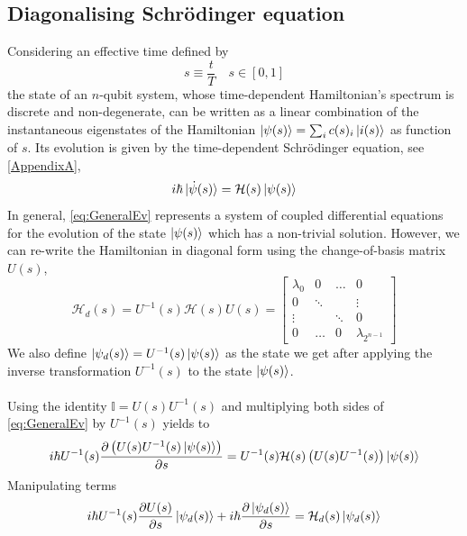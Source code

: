 \subsection{Diagonalising Schrödinger equation}
Considering an effective time defined by
\begin{equation}
    s \equiv \frac{t}{T} \quad s \in [0,1]
\end{equation}
the state of an $n$-qubit system, whose time-dependent Hamiltonian's spectrum is discrete and non-degenerate, can be written as a linear combination of the instantaneous eigenstates of the Hamiltonian $\ket{\psi(s)} = \sum_{i}c(s)_{i}\ket{i(s)}$ as function of $s$. Its evolution is given by the time-dependent Schrödinger equation, see \ref{AppendixA},
\begin{equation}
\label{eq:GeneralEv}
    i\hbar \ket{\dot{\psi}(s)} = \mathcal{H}(s) \ket{\psi(s)}
\end{equation}
In general, \ref{eq:GeneralEv} represents a system of coupled differential equations for the evolution of the state $\ket{\psi(s)}$ which has a non-trivial solution. However, we can re-write the Hamiltonian in diagonal form using the change-of-basis matrix $U(s)$,
\begin{equation}
    \mathcal{H}_{d}(s) = U^{-1}(s)\mathcal{H}(s)U(s) = \begin{bmatrix}
           \lambda_{0} & 0 & \hdots & 0 \\
           0 &  \ddots & & \vdots \\
           \vdots &   & \ddots & 0 \\
           0 & \hdots & 0 & \lambda_{2^{n-1}}
         \end{bmatrix}
\end{equation}
We also define $\ket{\psi_{d}(s)} = U^{-1}(s)\ket{\psi(s)}$ as the state we get after applying the inverse transformation $U^{-1}(s)$ to the state $\ket{\psi(s)}$.\\\\
Using the identity $\mathbb{I} = U(s)U^{-1}(s)$ and multiplying both sides of \ref{eq:GeneralEv} by $U^{-1}(s)$ yields to
\begin{equation}
     i\hbar U^{-1}(s) \frac{\partial \left(U(s)U^{-1}(s)\ket{\psi(s)}\right)}{\partial s} = U^{-1}(s)\mathcal{H}(s) \left(U(s)U^{-1}(s)\right)\ket{\psi(s)}
\end{equation}
Manipulating terms
\begin{equation}
     i\hbar U^{-1}(s) \frac{\partial U(s)}{\partial s}\ket{\psi_{d}(s)} + i\hbar  \frac{\partial \ket{\psi_{d}(s)}}{\partial s}= \mathcal{H}_{d}(s)\ket{\psi_{d}(s)}
\end{equation}
